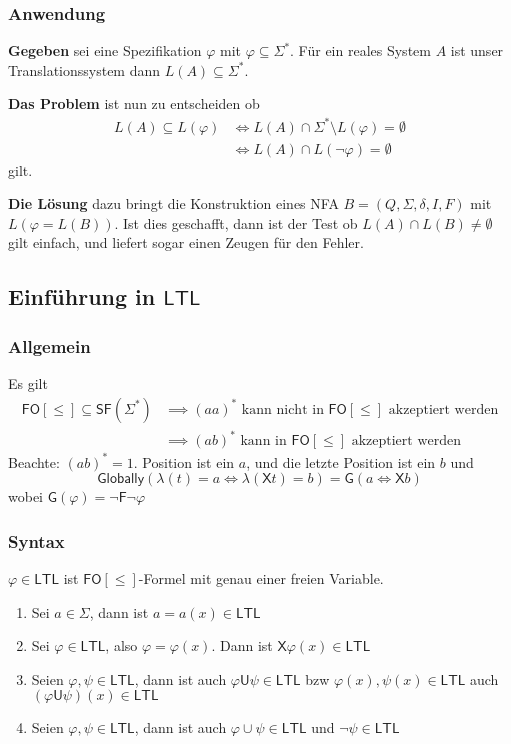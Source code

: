 \documentclass[12pt, german]{article}
\newcommand{\sigstern}{\Sigma^\ast}
\newcommand{\starfree}{\mathsf{SF}}
\newcommand{\fo}{\mathsf{FO}}
\newcommand{\ltl}{\mathsf{LTL}}
\newcommand{\sX}{\mathsf{X}}
\newcommand{\sF}{\mathsf{F}}
\newcommand{\sG}{\mathsf{G}}
\newcommand{\sU}{\mathsf{U}}
\begin{document}
\subsubsection{Anwendung}
	\textbf{Gegeben} sei eine Spezifikation $\varphi$ mit $\varphi \subseteq \sigstern$. Für ein reales System $A$ ist unser Translationssystem dann $L(A) \subseteq \sigstern$.
	\newline
	
		\textbf{Das Problem} ist nun zu entscheiden ob 
	\begin{align*}
	L(A) \subseteq L(\varphi) &\iff L(A) \cap \sigstern \setminus L(\varphi) = \emptyset \\
	&\iff L(A) \cap L(\neg \varphi) = \emptyset
	\end{align*} gilt.
	\newline
	
		\textbf{Die Lösung} dazu bringt die Konstruktion eines NFA $B = (Q, \Sigma, \delta, I, F)$ mit $L(\varphi = L(B))$. Ist dies geschafft, dann ist der Test ob $L(A) \cap L(B) \neq \emptyset$ gilt einfach, und liefert sogar einen Zeugen für den Fehler. 

\subsection{Einführung in $\ltl$}
\subsubsection{Allgemein}
	Es gilt 
	\begin{align*}
		\fo[\leq] \subseteq \starfree(\sigstern) &\implies (aa)^\ast \text{ kann nicht in } \fo[\leq] \text{ akzeptiert werden} \\
		&\implies (ab)^\ast \text{ kann in } \fo[\leq] \text{ akzeptiert werden} 
	\end{align*}
	Beachte: $(ab)^\ast = 1.$ Position ist ein $a$, und die letzte Position ist ein $b$ und $$\mathsf{Globally}(\lambda(t) = a \iff \lambda(\sX t) = b) = \sG(a \iff \sX b)$$ wobei $\sG(\varphi) = \neg \sF \neg \varphi$

\subsubsection{Syntax}
	$\varphi \in \ltl$ ist $\fo[\leq]$-Formel mit genau einer freien Variable.
		\begin{enumerate}[label=\arabic*.)]
			\item Sei $a \in \Sigma$, dann ist $a = a(x) \in \ltl$
			\item Sei $\varphi \in \ltl$, also $\varphi = \varphi(x)$. Dann ist $\sX \varphi(x) \in \ltl$
			\item Seien $\varphi, \psi \in \ltl$, dann ist auch $\varphi \sU \psi \in \ltl$ bzw $\varphi(x), \psi(x) \in \ltl$ auch $(\varphi \sU \psi )(x)\in \ltl$
			\item Seien $\varphi, \psi \in \ltl$, dann ist auch $\varphi \cup \psi \in \ltl$ und $\neg \psi\in \ltl$
		\end{enumerate}
	
\end{document}
